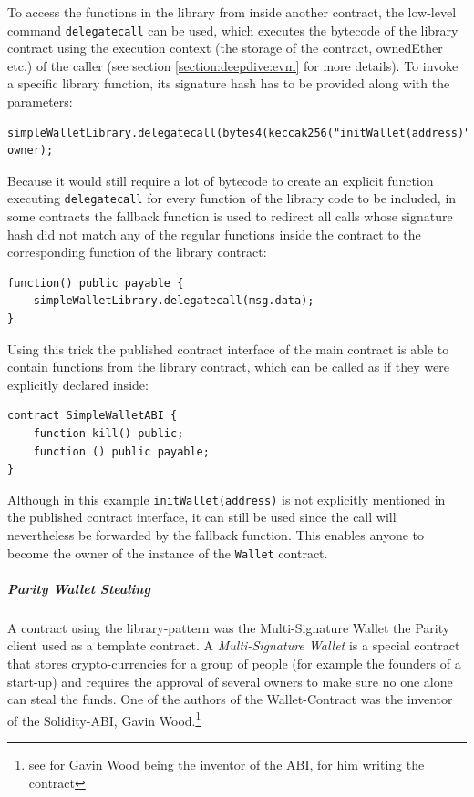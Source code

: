 To access the functions in the library from inside another contract, the low-level command \texttt{delegate\-call} can be used, which executes the bytecode of the library contract using the execution context (the storage of the contract, ownedEther etc.) of the caller (see section \ref{section:deepdive:evm} for more details). To invoke a specific library function, its signature hash has to be provided along with the parameters:
\begin{verbatim}
simpleWalletLibrary.delegatecall(bytes4(keccak256("initWallet(address)")), owner);
\end{verbatim}

Because it would still require a lot of bytecode to create an explicit function executing \texttt{delegate\-call} for every function of the library code to be included, in some contracts the fallback function is used to redirect all calls whose signature hash did not match any of the regular functions inside the contract to the corresponding function of the library contract:
\begin{verbatim}
function() public payable {
    simpleWalletLibrary.delegatecall(msg.data);
}
\end{verbatim}

Using this trick the published contract interface of the main contract is able to contain functions from the library contract, which can be called as if they were explicitly declared inside:
\begin{verbatim}
contract SimpleWalletABI {
    function kill() public;
    function () public payable;
}
\end{verbatim}

Although in this example \texttt{initWallet(address)} is not explicitly mentioned in the published contract interface, it can still be used since the call will nevertheless be forwarded by the fallback function. This enables anyone to become the owner of the instance of the \texttt{Wallet} contract.

\subparagraph{Parity Wallet Stealing}
A contract using the library-pattern was the Multi-Signature Wallet the Parity client used as a template contract. A \textit{Multi-Signature Wallet} is a special contract that stores crypto-currencies for a group of people (for example the founders of a start-up) and requires the approval of several owners to make sure no one alone can steal the funds. One of the authors of the Wallet-Contract was the inventor of the Solidity-ABI, Gavin Wood.\footnote{see \cite{wikisource:solidityinventorgavinwood} for Gavin Wood being the inventor of the ABI, \cite{code:parityenhancedwalletsteal} for him writing the contract}

